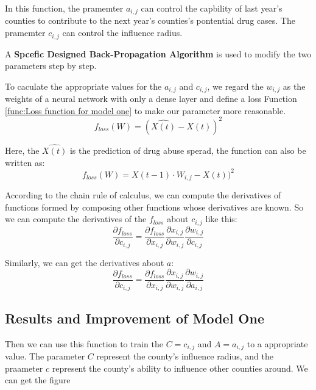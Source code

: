 \documentclass{mcmthesis}
\begin{document}
	\par In this function, the pramemter $a_{i, j}$ can control the capbility of last year's counties to contribute to the next year's counties's pontential drug cases. The pramemter $c_{i, j}$ can control the influence radius.
	\par A \textbf{Spcefic Designed Back-Propagation Algorithm} is used to modify the two parameters step by step. 
	\par To caculate the appropriate values for the $a_{i, j}$ and $c_{i, j}$, we regard the $w_{i, j}$ as the weights of a neural network with only a dense layer and define a loss Function \ref{func:Loss function for model one} to make our parameter more reasonable.
		$$f_{loss}(W) = (\hat{X(t)} - X(t))^2 \label{func:Loss function for model one} $$
	\par Here, the $\hat{X(t)}$ is the prediction of drug abuse sperad, the function can also be written as:
		$$ f_{loss}(W) = X(t-1) \cdot W_{i, j} - X(t))^2 $$
	\par According to the chain rule of calculus, we can compute the derivatives of functions formed by composing other functions whose derivatives are known. So we can compute the derivatives of the $f_{loss}$ about $c_{i, j}$ like this:
		$$
		\frac{\partial f_{loss}}{\partial c_{i,j}} = \frac{\partial f_{loss}}{\partial x_{i,j}}
		\frac{\partial x_{i, j}}{\partial w_{i,j}} \frac{\partial w_{i,j}}{\partial c_{i, j}}
		$$
	\par Similarly, we can get the derivatives about $a$:
		$$
		\frac{\partial f_{loss}}{\partial c_{i,j}} = \frac{\partial f_{loss}}{\partial x_{i,j}}
		\frac{\partial x_{i, j}}{\partial w_{i,j}} \frac{\partial w_{i,j}}{\partial a_{i, j}}
		$$
	\subsection{Results and Improvement of Model One}
	
	\par Then we can use this function to train the $C = c_{i, j}$ and $A = a_{i, j}$ to a appropriate value. The parameter $C$ represent the county's influence radius, and the praameter $c$ represent the county's ability to influence other counties around. We can get the figure 
	
\end{document}
